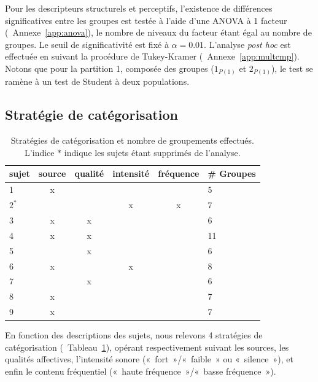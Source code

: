 Pour les descripteurs structurels et perceptifs, l'existence de différences significatives entre les groupes est testée à l'aide d'une ANOVA à 1 facteur (\cf~Annexe~\ref{app:anova}), le nombre de niveaux du facteur étant égal au nombre de groupes. Le seuil de significativité est fixé à $\alpha=0.01$. L'analyse \emph{post hoc} est effectuée en suivant la procédure de Tukey-Kramer (\cf~Annexe~\ref{app:multcmp}). Notons que pour la partition 1, composée des groupes ($1_{P(1)}$ et $2_{P(1)}$), le test se ramène à un test de Student à deux populations.

\subsection{Stratégie de catégorisation}

\begin{table}[t]
\centering
\begin{tabular}{l|cccc|l} 
sujet    & source & qualité & intensité & fréquence & \# Groupes \\
\hline
    1    &   x    &         &        &           & 5  \\
    $2^*$&        &         &    x   &     x     & 7  \\
    3    &   x    &    x    &        &           & 6  \\
    4    &   x    &    x    &        &           & 11 \\        
    5    &        &    x    &        &           & 6  \\
    6    &   x    &         &    x   &           & 8  \\
    7    &        &    x    &        &           & 6  \\
    8    &   x    &         &        &           & 7  \\
    9    &   x    &         &        &           & 7  \\
\hline
\end{tabular}
\vspace{0.5mm}
\caption[Stratégies de catégorisation et nombre de groupements effectués.]{Stratégies de catégorisation et nombre de groupements effectués. L'indice $*$ indique les sujets étant supprimés de l'analyse.}
\label{tab:StratSate}
\end{table}

En fonction des descriptions des sujets, nous relevons 4 stratégies de catégorisation (\cf~Tableau~\ref{tab:StratSate}), opérant respectivement suivant les sources, les qualités affectives, l'intensité sonore («~fort~»/«~faible~» ou «~silence~»), et enfin le contenu fréquentiel («~haute fréquence~»/«~basse fréquence~»).

